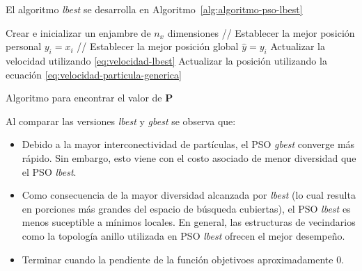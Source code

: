 \documentclass{article}
\begin{document}
El algoritmo \emph{lbest} se desarrolla en Algoritmo~\ref{alg:algoritmo-pso-lbest}
\begin{algorithm} 
\begin{algorithmic}[1] 
\STATE Crear e inicializar un enjambre de $n_x$ dimensiones
\REPEAT
		\STATE // Establecer la mejor posición personal
			\STATE $y_i = x_i$
		\ENDIF
		\STATE // Establecer la mejor posición global 
			\STATE $\hat{y} = y_i$
		\ENDIF
	\ENDFOR
		\STATE Actualizar la velocidad utilizando \ref{eq:velocidad-lbest}
		\STATE Actualizar la posición utilizando la ecuación \ref{eq:velocidad-particula-generica}
	\ENDFOR
{}
\end{algorithmic} 
\caption{Algoritmo para encontrar el valor de $\mathbf{P}$} 
\label{alg:algoritmo-pso-lbest}
\end{algorithm}

Al comparar las versiones \emph{lbest} y \emph{gbest} se observa que:
\begin{itemize}
	\item Debido a la mayor interconectividad de partículas, el PSO \emph{gbest} converge más rápido.
	Sin embargo, esto viene con el costo asociado de menor diversidad que el PSO \emph{lbest}.
	\item Como consecuencia de la mayor diversidad alcanzada por \emph{lbest} (lo cual resulta en porciones más grandes del espacio de búsqueda cubiertas), el PSO \emph{lbest} es menos suceptible a mínimos locales.
	En general, las estructuras de vecindarios como la topología anillo utilizada en PSO \emph{lbest} ofrecen el mejor desempeño.
	\item Terminar cuando la pendiente de la función objetivoes aproximadamente 0.
\end{itemize}
\end{document}
